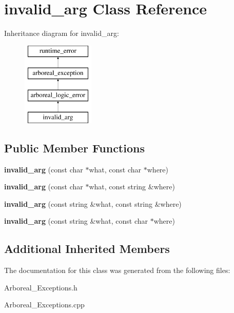 \hypertarget{classinvalid__arg}{}\section{invalid\+\_\+arg Class Reference}
\label{classinvalid__arg}
Inheritance diagram for invalid\+\_\+arg\+:\begin{figure}[H]
\begin{center}
\leavevmode
\includegraphics[height=4.000000cm]{classinvalid__arg}
\end{center}
\end{figure}
\subsection*{Public Member Functions}
\begin{DoxyCompactItemize}
\item 
\mbox{\label{classinvalid__arg_a47a6d404f08083db4243703c091fff76}} 
{\bfseries invalid\+\_\+arg} (const char $\ast$what, const char $\ast$where)
\item 
\mbox{\label{classinvalid__arg_ad3f909f981cd5b8ad1b5efe8afbe5ba1}} 
{\bfseries invalid\+\_\+arg} (const char $\ast$what, const string \&where)
\item 
\mbox{\label{classinvalid__arg_aac8373819f9c70bb5fb811e991e48dc3}} 
{\bfseries invalid\+\_\+arg} (const string \&what, const string \&where)
\item 
\mbox{\label{classinvalid__arg_a6c4ad9d89bdc9a63cdad04f4d2e8ca4f}} 
{\bfseries invalid\+\_\+arg} (const string \&what, const char $\ast$where)
\end{DoxyCompactItemize}
\subsection*{Additional Inherited Members}


The documentation for this class was generated from the following files\+:\begin{DoxyCompactItemize}
\item 
Arboreal\+\_\+\+Exceptions.\+h\item 
Arboreal\+\_\+\+Exceptions.\+cpp\end{DoxyCompactItemize}
